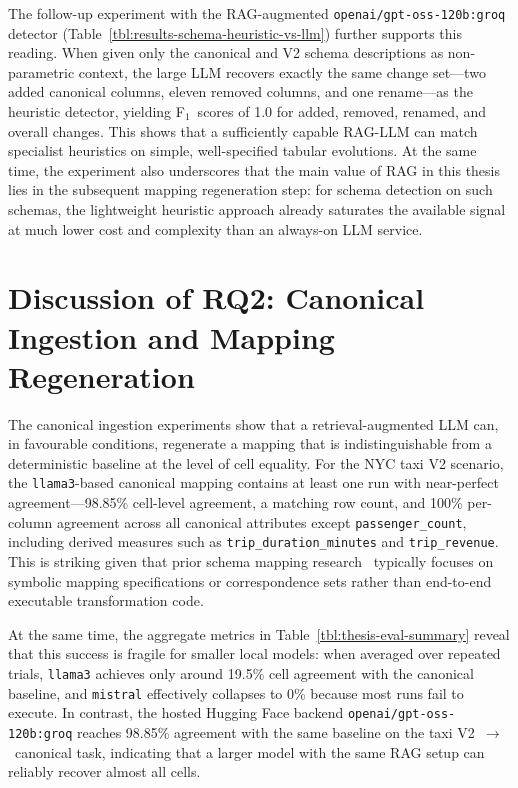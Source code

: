 The follow-up experiment with the RAG-augmented \texttt{openai/gpt-oss-120b:groq} detector (Table~\ref{tbl:results-schema-heuristic-vs-llm}) further supports this reading. When given only the canonical and V2 schema descriptions as non-parametric context, the large LLM recovers exactly the same change set---two added canonical columns, eleven removed columns, and one rename---as the heuristic detector, yielding F\(_1\)~scores of 1.0 for added, removed, renamed, and overall changes. This shows that a sufficiently capable RAG-LLM can match specialist heuristics on simple, well-specified tabular evolutions. At the same time, the experiment also underscores that the main value of RAG in this thesis lies in the subsequent mapping regeneration step: for schema detection on such schemas, the lightweight heuristic approach already saturates the available signal at much lower cost and complexity than an always-on LLM service.


\section{Discussion of RQ2: Canonical Ingestion and Mapping Regeneration}
\label{sec:discussion-rq2}

The canonical ingestion experiments show that a retrieval-augmented LLM can, in favourable conditions, regenerate a mapping that is indistinguishable from a deterministic baseline at the level of cell equality. For the NYC taxi V2 scenario, the \texttt{llama3}-based canonical mapping contains at least one run with near-perfect agreement---98.85\% cell-level agreement, a matching row count, and 100\% per-column agreement across all canonical attributes except \texttt{passenger\_count}, including derived measures such as \texttt{trip\_duration\_minutes} and \texttt{trip\_revenue}. This is striking given that prior schema mapping research~\cite{velegrakis2003mapping,yu2005semantic} typically focuses on symbolic mapping specifications or correspondence sets rather than end-to-end executable transformation code.

At the same time, the aggregate metrics in Table~\ref{tbl:thesis-eval-summary} reveal that this success is fragile for smaller local models: when averaged over repeated trials, \texttt{llama3} achieves only around 19.5\% cell agreement with the canonical baseline, and \texttt{mistral} effectively collapses to 0\% because most runs fail to execute. In contrast, the hosted Hugging Face backend \texttt{openai/gpt-oss-120b:groq} reaches 98.85\% agreement with the same baseline on the taxi V2~$\rightarrow$~canonical task, indicating that a larger model with the same RAG setup can reliably recover almost all cells. 

